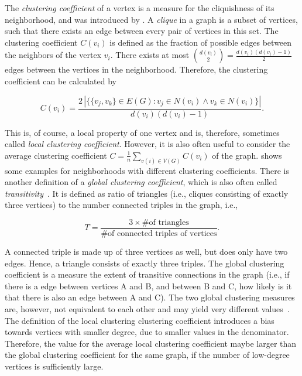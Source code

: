 The \emph{clustering coefficient} of a vertex is a measure for the cliquishness of its neighborhood, and was introduced by \citet{Watts1998}.
A \emph{clique} in a graph is a subset of vertices, such that there exists an edge between every pair of vertices in this set.
The clustering coefficient \(C(v_i)\) is defined as the fraction of possible edges between the neighbors of the vertex \(v_i\).
There exists at most \(\binom{d(v_i)}{2} = \frac{d(v_i)(d(v_i) - 1)}{2}\)  edges between the vertices in the neighborhood.
Therefore, the clustering coefficient can be calculated by

\begin{equation}
 C(v_i) = \frac{2 \, |\{\{v_j, v_k\} \in E(G) : v_j \in N(v_i) \wedge v_k \in N(v_i)\}| }{d(v_i)(d(v_i) - 1)}.
\end{equation}

This is, of course, a local property of one vertex and is, therefore, sometimes called \emph{local clustering coefficient}.
However, it is also often useful to consider the average clustering coefficient \(C = \frac{1}{n} \sum_{v(i) \in V(G)} C(v_i)\) of the graph.
 shows some examples for neighborhoods with different clustering coefficients.
There is another definition of a \emph{global clustering coefficient}, which is also often called \emph{transitivity}~\cite{Boccaletti2006}.
It is defined as ratio of triangles (i.e., cliques consisting of exactly three vertices) to the number connected triples in the graph, i.e.,

\begin{equation}
 T = \frac{3 \times \text{\# of triangles}}{\text{\# of connected triples of vertices}}.
\end{equation}

A connected triple is made up of three vertices as well, but does only have two edges.
Hence, a triangle consists of exactly three triples.
The global clustering coefficient is a measure the extent of transitive connections in the graph (i.e., if there is a edge between vertices A and B, and between B and C, how likely is it that there is also an edge between A and C).
The two global clustering measures are, however, not equivalent to each other and may yield very different values~\cite{Newman2010}.
The definition of the local clustering clustering coefficient introduces a bias towards vertices with smaller degree, due to smaller values in the denominator.
Therefore, the value for the average local clustering coefficient maybe larger than the global clustering coefficient for the same graph, if the number of low-degree vertices is sufficiently large.

